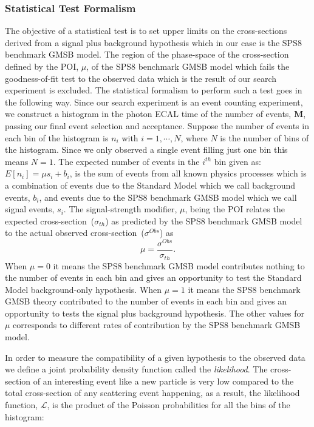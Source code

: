 \subsubsection{Statistical Test Formalism}
The objective of a statistical test is to set upper limits on the cross-sections derived from a signal plus background hypothesis which in our case is the SPS8 benchmark GMSB model. The region of the phase-space of the cross-section defined by the POI, $\mu$, of the SPS8  benchmark GMSB model which fails the goodness-of-fit test to the observed data which is the result of our search experiment  is excluded. The statistical formalism to perform such a test goes in the following way. 
\newline
Since our search experiment is an event counting experiment, we construct a histogram in the photon ECAL time of the number of events, $\mathbf{M}$, passing our final event selection and acceptance. Suppose the number of events in each bin of the histogram is $n_{i}$ with $i = 1, \cdots, N$, where $N$ is the number of bins of the histogram. Since we only observed a single event filling just one bin this means $N = 1$. The expected number of events in the $i^{th}$ bin given as:
$ E[n_{i}] = \mu s_{i} + b_{i}$, is the sum of events from all known physics processes which is a combination of events due to the Standard Model which we  call background events, $b_{i}$, and events due to the  SPS8 benchmark GMSB model which we call signal events, $s_{i}$. The signal-strength modifier, $\mu$, being the POI relates the expected cross-section~($\sigma_{th}$) as predicted by the SPS8  benchmark GMSB model to the actual observed cross-section~($\sigma^{Obs}$) as
\begin{equation}
\mu = \frac{\sigma^{Obs}}{\sigma_{th}}.
\end{equation}
When $\mu = 0$ it means the  SPS8  benchmark GMSB model contributes nothing to the number of events in each bin and gives an opportunity to test the Standard Model background-only hypothesis.
\newline
When $\mu=1$ it means the SPS8  benchmark GMSB theory contributed to the number of events in each bin and gives an opportunity to tests the signal plus background hypothesis. 
\newline
The other values for $\mu$ corresponds to different rates of contribution by the SPS8 benchmark GMSB model.
\par 
In order to measure the compatibility of a given hypothesis to the observed data we define a joint probability density function called the \textit{likelihood}. The cross-section of an interesting event like a new particle is very low compared to the total cross-section of any scattering event happening, as a result, the likelihood function, $\mathcal{L}$, is the product of the Poisson probabilities for all the bins of the histogram:
